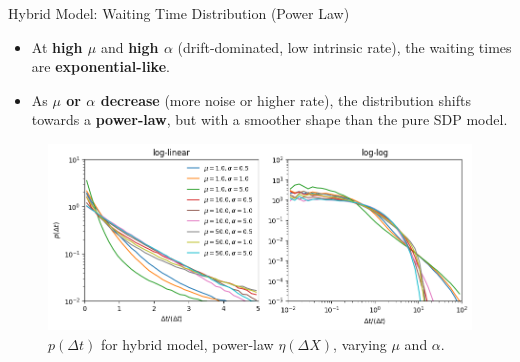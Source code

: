 \begin{frame}{Hybrid Model: Waiting Time Distribution (Power Law)}

    \begin{itemize}
        \item At \textbf{high $\mu$} and \textbf{high $\alpha$} (drift-dominated, low intrinsic rate), the waiting times are \textbf{exponential-like}.
        \item As \textbf{$\mu$ or $\alpha$ decrease} (more noise or higher rate), the distribution shifts towards a \textbf{power-law}, but with a smoother shape than the pure SDP model.
    \end{itemize}

    \vspace{-0.5em}

    \begin{figure}
        \centering
        \includegraphics[width=0.9\linewidth]{assets/wtd_powerlaw_hybrid.png}
        \vspace{-1em}
        \caption{$p(\Delta t)$ for hybrid model, power-law $\eta(\Delta X)$, varying $\mu$ and $\alpha$.}
    \end{figure}
\end{frame}

